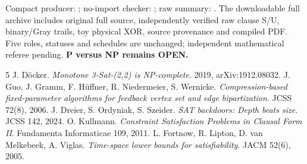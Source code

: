 \documentclass[11pt]{article}
\begin{document}
Compact producer: ; no-import checker: ; raw summary: . The downloadable full archive includes original full source, independently verified raw clause S/U, binary/Gray trails, toy physical XOR, source provenance and compiled PDF. Five roles, statuses and schedules are unchanged; independent mathematical referee pending. \textbf{P versus NP remains OPEN.}
\begin{thebibliography}{5}
 J. D\"ocker. \emph{Monotone 3-Sat-(2,2) is NP-complete}. 2019, arXiv:1912.08032.
 J. Guo, J. Gramm, F. H\"uffner, R. Niedermeier, S. Wernicke. \emph{Compression-based fixed-parameter algorithms for feedback vertex set and edge bipartization}. JCSS 72(8), 2006.
 J. Dreier, S. Ordyniak, S. Szeider. \emph{SAT backdoors: Depth beats size}. JCSS 142, 2024.
 O. Kullmann. \emph{Constraint Satisfaction Problems in Clausal Form II}. Fundamenta Informaticae 109, 2011.
 L. Fortnow, R. Lipton, D. van Melkebeek, A. Viglas. \emph{Time-space lower bounds for satisfiability}. JACM 52(6), 2005.
\end{thebibliography}
\end{document}

